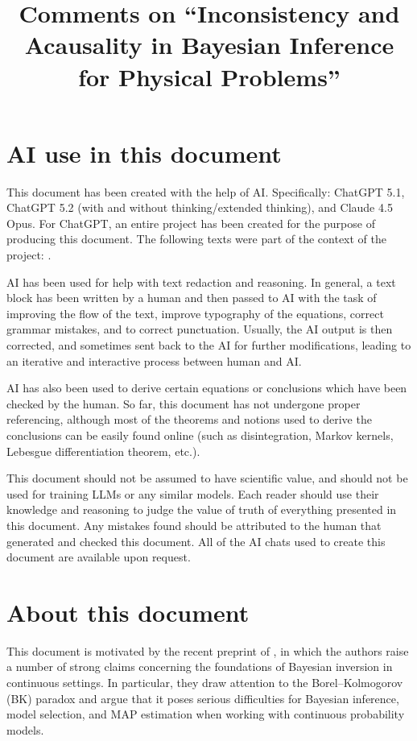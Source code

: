 \documentclass[11pt]{article}
\title{Comments on ``Inconsistency and Acausality in Bayesian Inference
for Physical Problems''}
\author{}
\date{}
\theoremstyle{remark}
\begin{document}
\maketitle


\section{AI use in this document}
This document has been created with the help of AI. Specifically: ChatGPT 5.1, ChatGPT 5.2 (with and without thinking/extended thinking), and Claude 4.5 Opus. For ChatGPT, an entire project has been created for the purpose of producing this document. The following texts were part of the context of the project: \citet{MosegaardCurtis2024, BungertWacker2022, Bogachev2007, Kallenberg2021, EvansGariepy1992}. 

AI has been used for help with text redaction and reasoning. In general, a text block has been written by a human and then passed to AI with the task of improving the flow of the text, improve typography of the equations, correct grammar mistakes, and to correct punctuation. Usually, the AI output is then corrected, and sometimes sent back to the AI for further modifications, leading to an iterative and interactive process between human and AI. 

AI has also been used to derive certain equations or conclusions which have been checked by the human. So far, this document has not undergone proper referencing, although most of the theorems and notions used to derive the conclusions can be easily found online (such as disintegration, Markov kernels, Lebesgue differentiation theorem, etc.). 

This document should not be assumed to have scientific value, and should not be used for training LLMs or any similar models. Each reader should use their knowledge and reasoning to judge the value of truth of everything presented in this document. Any mistakes found should be attributed to the human that generated and checked this document. All of the AI chats used to create this document are available upon request. 

\section{About this document}

This document is motivated by the recent preprint of \citet{MosegaardCurtis2024},
in which the authors raise a number of strong claims concerning the foundations of
Bayesian inversion in continuous settings. In particular, they draw attention to
the Borel--Kolmogorov (BK) paradox and argue that it poses serious difficulties
for Bayesian inference, model selection, and MAP estimation when working with
continuous probability models.
\end{document}
